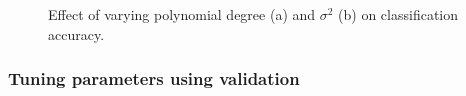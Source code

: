 \documentclass{article}
\begin{document}
\begin{figure}[h]
\begin{subfigure}[b]{0.4\textwidth}
                 \label{fig:rbf_sigma2}
             \end{subfigure}
             \hspace{0.05\textwidth}
            \caption{Effect of varying polynomial degree (a) and $\sigma^2$ (b) on classification accuracy. }
        \end{figure}
            
            
        \subsubsection{Tuning parameters using validation}
\end{document}
